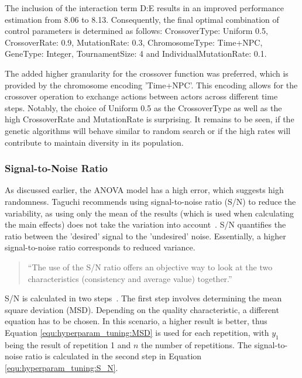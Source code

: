 The inclusion of the interaction term D:E results in an improved performance estimation from 8.06 to 8.13. Consequently, the final optimal combination of control parameters is determined as follows: CrossoverType: Uniform 0.5, CrossoverRate: 0.9, MutationRate: 0.3, ChromosomeType: Time+NPC, GeneType: Integer, TournamentSize: 4 and IndividualMutationRate: 0.1.

The added higher granularity for the crossover function was preferred, which is provided by the chromosome encoding 'Time+NPC'. This encoding allows for the crossover operation to exchange actions between actors across different time steps. Notably, the choice of Uniform 0.5 as the CrossoverType as well as the high CrossoverRate and MutationRate is surprising. It remains to be seen, if the genetic algorithms will behave similar to random search or if the high rates will contribute to maintain diversity in its population.

\subsubsection{Signal-to-Noise Ratio}
As discussed earlier, the ANOVA model has a high error, which suggests high randomness. Taguchi recommends using signal-to-noise ratio (S/N) to reduce the variability, as using only the mean of the results (which is used when calculating the main effects) does not take the variation into account~\cite{roy_primer_1990}. S/N quantifies the ratio between the 'desired' signal to the 'undesired' noise. Essentially, a higher signal-to-noise ratio corresponds to reduced variance.

\begin{quote}
	\begin{em}
		\enquote{The use of the S/N ratio offers an objective way to look at the two characteristics (consistency and average value) together.}~\cite{roy_primer_1990}
	\end{em}
\end{quote}

S/N is calculated in two steps~\cite{roy_primer_1990}. The first step involves determining  the mean square deviation (MSD). Depending on the quality characteristic, a different equation has to be chosen. In this scenario, a higher result is better, thus Equation \ref{equ:hyperparam_tuning:MSD} is used for each repetition, with $y_1$ being the result of repetition 1 and $n$ the number of repetitions. The signal-to-noise ratio is calculated in the second step in Equation \ref{equ:hyperparam_tuning:S_N}.

